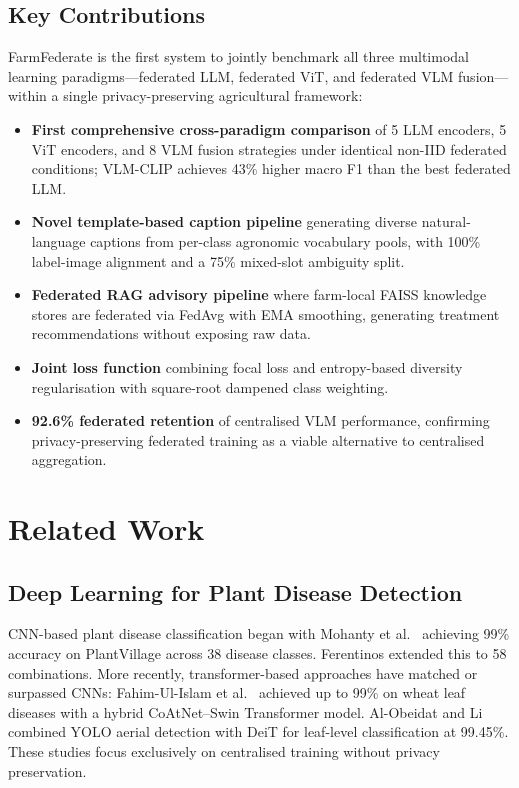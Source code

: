 \documentclass[12pt, a4paper, oneside]{Thesis}
\begin{document}
\section{Key Contributions}

FarmFederate is the first system to jointly benchmark all three multimodal learning paradigms---federated LLM, federated ViT, and federated VLM fusion---within a single privacy-preserving agricultural framework:

\begin{itemize}[leftmargin=1.2em]
  \item \textbf{First comprehensive cross-paradigm comparison} of 5 LLM encoders, 5 ViT encoders, and 8 VLM fusion strategies under identical non-IID federated conditions; VLM-CLIP achieves 43\% higher macro F1 than the best federated LLM.
  \item \textbf{Novel template-based caption pipeline} generating diverse natural-language captions from per-class agronomic vocabulary pools, with 100\% label-image alignment and a 75\% mixed-slot ambiguity split.
  \item \textbf{Federated RAG advisory pipeline} where farm-local FAISS knowledge stores are federated via FedAvg with EMA smoothing, generating treatment recommendations without exposing raw data.
  \item \textbf{Joint loss function} combining focal loss and entropy-based diversity regularisation with square-root dampened class weighting.
  \item \textbf{92.6\% federated retention} of centralised VLM performance, confirming privacy-preserving federated training as a viable alternative to centralised aggregation.
\end{itemize}

\chapter{Related Work}
\label{Chapter2}

\section{Deep Learning for Plant Disease Detection}
CNN-based plant disease classification began with Mohanty et al.\ \cite{Mohanty2016} achieving 99\% accuracy on PlantVillage across 38 disease classes. Ferentinos \cite{Ferentinos2018} extended this to 58 combinations. More recently, transformer-based approaches have matched or surpassed CNNs: Fahim-Ul-Islam et al.\ \cite{FahimUlIslam2024} achieved up to 99\% on wheat leaf diseases with a hybrid CoAtNet--Swin Transformer model. Al-Obeidat and Li \cite{AlObeidat2025} combined YOLO aerial detection with DeiT for leaf-level classification at 99.45\%. These studies focus exclusively on centralised training without privacy preservation.
\end{document}
